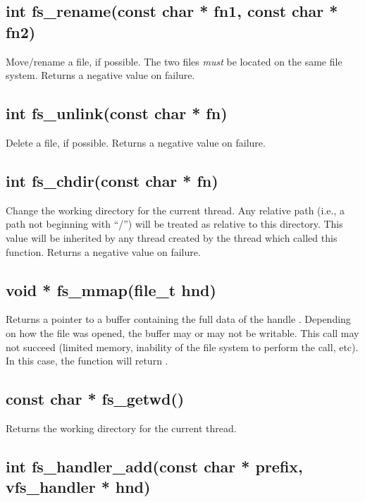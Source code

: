 \documentclass[english]{report}
\begin{document}

\subsection{int fs\_rename(const char * fn1, const char * fn2)}

Move/rename a file, if possible. The two files \emph{must} be located
on the same file system. Returns a negative value on failure.


\subsection{int fs\_unlink(const char * fn)}

Delete a file, if possible. Returns a negative value on failure.


\subsection{int fs\_chdir(const char * fn)}

Change the working directory for the current thread. Any relative
path (i.e., a path not beginning with ``/'') will be treated as
relative to this directory. This value will be inherited by any thread
created by the thread which called this function. Returns a negative
value on failure.


\subsection{void * fs\_mmap(file\_t hnd)}

Returns a pointer to a buffer containing the full data of the handle
. Depending on how the file was opened, the buffer may or
may not be writable. This call may not succeed (limited memory, inability
of the file system to perform the call, etc). In this case, the function
will return .


\subsection{const char * fs\_getwd()}

Returns the working directory for the current thread.


\subsection{int fs\_handler\_add(const char * prefix, vfs\_handler * hnd)}
\end{document}
